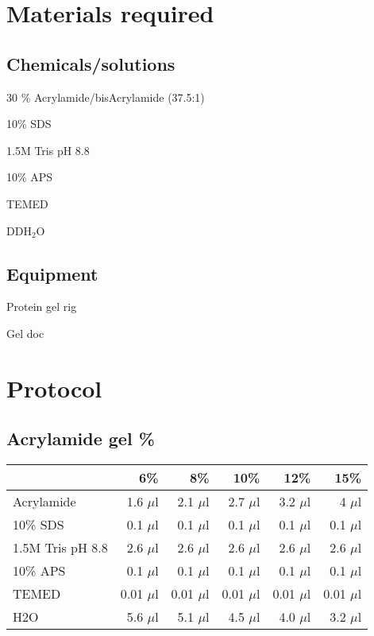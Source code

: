 \documentclass[a4paper,12pt]{article}
\newenvironment{packed_enum}{
\begin{enumerate}
  \setlength{\itemsep}{1pt}
  \setlength{\parskip}{0pt}
  \setlength{\parsep}{0pt}
}{\end{enumerate}}
\begin{document}
\section{Materials required}
	\subsection{Chemicals/solutions}
	\begin{packed_enum}
	\item 30 \% Acrylamide/bisAcrylamide (37.5:1)
	\item 10\% SDS
	\item 1.5M Tris pH 8.8
	\item 10\% APS		
	\item	TEMED		
	\item 	DDH$_{2}$O	
	\end{packed_enum}
	
	\subsection{Equipment}
	\begin{packed_enum}
		\item Protein gel rig
		\item Gel doc
	\end{packed_enum}
 

\section{Protocol}
	\subsection{Acrylamide gel \%}
	\begin{tabular}{l r r r r r}
	{\bf   } & {\bf 6\%} & {\bf 8\%} & {\bf 10\%} & {\bf 12\%} & {\bf 15\%}\\
			\hline
	Acrylamide	&	1.6 $\mu$l	& 2.1 $\mu$l & 2.7 $\mu$l & 3.2 $\mu$l &	4 $\mu$l \\
	10\% SDS		 & 0.1 $\mu$l	 & 0.1 $\mu$l & 	0.1 $\mu$l & 	0.1 $\mu$l	 & 0.1 $\mu$l\\
	1.5M Tris pH 8.8  & 2.6 $\mu$l	 & 2.6 $\mu$l	 & 2.6 $\mu$l	 & 2.6 $\mu$l	& 2.6 $\mu$l\\
	10\% APS		 & 0.1 $\mu$l	 & 0.1 $\mu$l	 & 0.1 $\mu$l	 & 0.1 $\mu$l	 & 0.1 $\mu$l\\
	TEMED		 & 0.01 $\mu$l & 0.01 $\mu$l & 0.01 $\mu$l	 & 0.01 $\mu$l	 & 0.01 $\mu$l\\
	H2O		 & 5.6 $\mu$l	 & 5.1 $\mu$l	 & 4.5 $\mu$l	 & 4.0 $\mu$l	 & 3.2 $\mu$l\\
		\hline
	
	\end{tabular}
\end{document}
